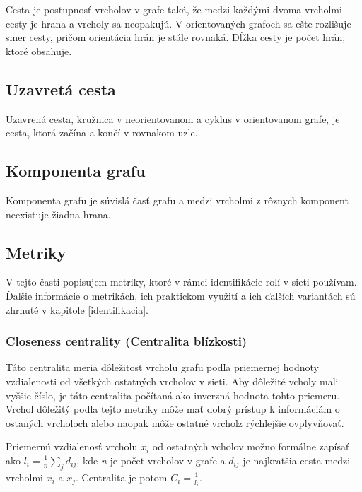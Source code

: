 \documentclass[slovak,master,public,dept460,male,cpdeclaration,oneside]{diploma}
\begin{document}
Cesta je postupnosť vrcholov v grafe taká, že medzi každými dvoma vrcholmi cesty je hrana a vrcholy sa neopakujú. V orientovaných grafoch sa ešte rozlišuje smer cesty, pričom orientácia hrán je stále rovnaká. Dĺžka cesty je počet hrán, ktoré obsahuje.

\subsection{Uzavretá cesta}

Uzavrená cesta, kružnica v neorientovanom a cyklus v orientovanom grafe, je cesta, ktorá začína a končí v rovnakom uzle.

\subsection{Komponenta grafu}

Komponenta grafu je súvislá časť grafu a medzi vrcholmi z rôznych komponent neexistuje žiadna hrana.

\subsection{Metriky}
V tejto časti popisujem metriky, ktoré v rámci identifikácie rolí v sieti používam. Ďalšie informácie o metrikách, ich praktickom využití a ich ďalších variantách sú zhrnuté v kapitole \ref{identifikacia}.

\subsubsection{Closeness centrality (Centralita blízkosti)}
Táto centralita meria dôležitosť vrcholu grafu podľa priemernej hodnoty vzdialenosti od všetkých ostatných vrcholov v sieti. Aby dôležité vcholy mali vyššie číslo, je táto centralita počítaná ako inverzná hodnota tohto priemeru. Vrchol dôležitý podľa tejto metriky môže mať dobrý prístup k informáciám o ostaných vrcholoch alebo naopak môže ostatné vrcholz rýchlejšie ovplyvňovať.

Priemernú vzdialenosť vrcholu ${x_{i}}$ od ostatných vcholov možno formálne zapísať ako ${l_{i} = \frac{1}{n}\sum_{j}d_{ij}}$, kde \textit{n} je počet vrcholov v grafe a ${d_{ij}}$ je najkratšia cesta medzi vrcholmi  ${x_{i}}$ a  ${x_{j}}$. Centralita je potom  ${C_{i} = \frac{1}{l_{i}}}$.
\end{document}
